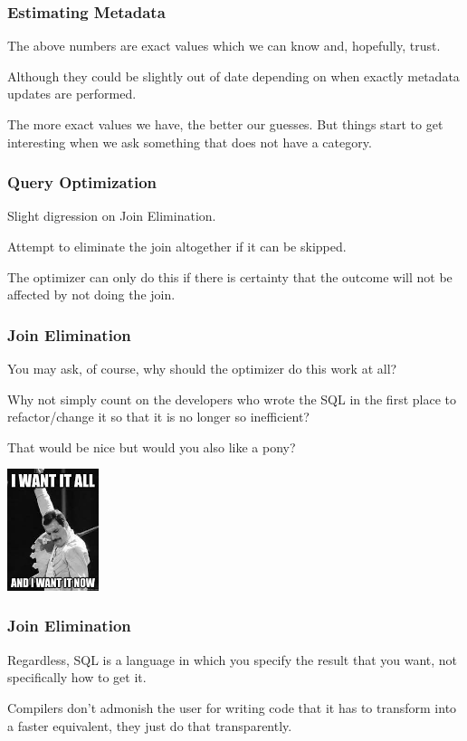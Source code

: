 \begin{frame}
\frametitle{Estimating Metadata}

The above numbers are exact values which we can know and, hopefully, trust. 

Although they could be slightly out of date depending on when exactly metadata updates are performed. 

The more exact values we have, the better our guesses. But things start to get interesting when we ask something that does not have a category.


\end{frame}

\begin{frame}
\frametitle{Query Optimization}

Slight digression on \alert{Join Elimination}.

Attempt to eliminate the join altogether if it can be skipped. 

The optimizer can only do this if there is certainty that the outcome will not be affected by not doing the join. 


\end{frame}

\begin{frame}
\frametitle{Join Elimination}

You may ask, of course, why should the optimizer do this work at all? 

Why not simply count on the developers who wrote the SQL in the first place to refactor/change it so that it is no longer so inefficient? 

That would be nice but would you also like a pony? 


\begin{center}
	\includegraphics[width=0.2\textwidth]{images/wantitall.jpg}
\end{center}
\end{frame}

\begin{frame}
\frametitle{Join Elimination}


Regardless, SQL is a language in which you specify the result that you want, not specifically how to get it. 


Compilers don't admonish the user for writing code that it has to transform into a faster equivalent, they just do that transparently.


\end{frame}

